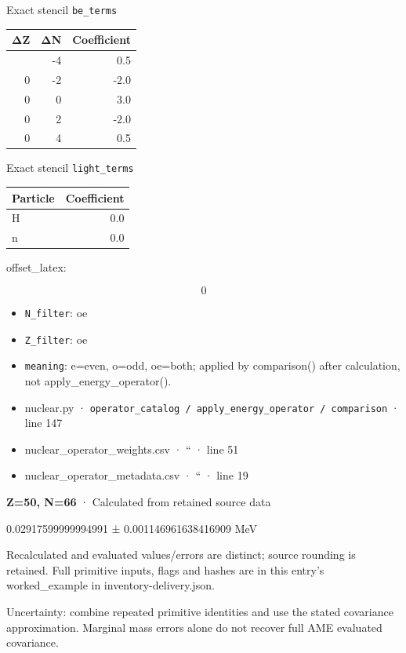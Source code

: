 \documentclass[
  11pt,
  letterpaper,
]{article}
\begin{document}
Exact stencil \texttt{be\_terms}

\begin{longtable}[]{@{}rrr@{}}
\toprule\noalign{}
ΔZ & ΔN & Coefficient \\
\midrule\noalign{}
\endhead
\bottomrule\noalign{}
\endlastfoot
0 & -4 & 0.5 \\
0 & -2 & -2.0 \\
0 & 0 & 3.0 \\
0 & 2 & -2.0 \\
0 & 4 & 0.5 \\
\end{longtable}

Exact stencil \texttt{light\_terms}

\begin{longtable}[]{@{}lr@{}}
\toprule\noalign{}
Particle & Coefficient \\
\midrule\noalign{}
\endhead
\bottomrule\noalign{}
\endlastfoot
H & 0.0 \\
n & 0.0 \\
\end{longtable}

offset\_latex:

\[
0
\]

\begin{itemize}
\item
  \texttt{N\_filter}: oe
\item
  \texttt{Z\_filter}: oe
\item
  \texttt{meaning}: e=even, o=odd, oe=both; applied by comparison()
  after calculation, not apply\_energy\_operator().
\item
  nuclear.py ·
  \texttt{operator\_catalog\ /\ apply\_energy\_operator\ /\ comparison}
  · line 147
\item
  nuclear\_operator\_weights.csv · `` · line 51
\item
  nuclear\_operator\_metadata.csv · `` · line 19
\end{itemize}

\textbf{Z=50, N=66} · Calculated from retained source data

0.02917599999994991 ± 0.001146961638416909 MeV

Recalculated and evaluated values/errors are distinct; source rounding
is retained. Full primitive inputs, flags and hashes are in this entry's
worked\_example in inventory-delivery.json.

Uncertainty: combine repeated primitive identities and use the stated
covariance approximation. Marginal mass errors alone do not recover full
AME evaluated covariance.
\end{document}
